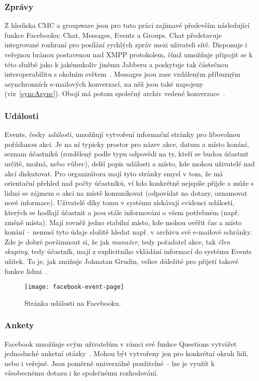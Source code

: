 \documentclass[12pt,oneside,final]{fithesis2}
\begin{document}
\subsubsection*{Zprávy}
Z hlediska CMC a groupware jsou pro tuto práci zajímavé především následující funkce Facebooku: Chat, Messages, Events a Groups. Chat představuje integrované rozhraní pro posílání rychlých zpráv mezi uživateli sítě. Disponuje i veřejnou bránou postavenou nad XMPP protokolem, čímž umožňuje připojit se k této službě jako k jakémukoliv jinému Jabberu a poskytuje tak částečnou interoperabilitu s okolním světem~\cite{reiss2010facebook}. Messages jsou zase vzdáleným příbuzným asynchronních e-mailových konverzací, na něž jsou také napojeny (viz~\ref{syncAsync}). Obojí má potom společný archiv vedené konverzace~\cite{seligstein2010see}.

\subsubsection*{Události}
Events, česky \emph{události}, umožňují vytvoření informační stránky pro libovolnou pořádanou akci. Je na ní typicky prostor pro název akce, datum a místo konání, seznam účastníků (rozdělený podle typu odpovědi na ty, kteří se budou účastnit určitě, možná, nebo vůbec), delší popis události a místo, kde mohou uživatelé nad akcí diskutovat. Pro organizátora mají tyto stránky smysl v tom, že má orientační přehled nad počty účastníků, ví kdo konkrétně nejspíše přijde a může s lidmi se zájmem o akci na místě komunikovat (odpovídat na dotazy, oznamovat nové informace). Uživatelé díky tomu v systému získávají evidenci událostí, kterých se hodlají účastnit a jsou stále informováni o všem potřebném (např. změně místa). Mají rovněž jedno stabilní místo, kde mohou ověřit čas a místo konání -- nemusí tyto údaje složitě hledat např. v archivu své e-mailové schránky. Zde je dobré povšimnout si, že jak \emph{manažer}, tedy pořadatel akce, tak \emph{člen skupiny}, tedy účastník, mají z explicitního vkládání informací do systému Events užitek. To je, jak zmiňuje Johnatan Grudin, velice důležité pro přijetí takové funkce lidmi~\cite{grudin1994groupware}.

\begin{figure}[H]
    \texttt{[image: facebook-event-page]}
    \caption{Stránka události na Facebooku.}
\end{figure}

\subsubsection*{Ankety}
Facebook umožňuje svým uživatelům v rámci své funkce Questions vytvářet jednoduché anketní otázky~\cite{graham2011the}. Mohou být vytvořeny jen pro konkrétní okruh lidí, nebo i veřejně. Jsou poměrně univerzálně použitelné -- lze je využít k všeobecnému dotazu i ke společnému rozhodování.
\end{document}

